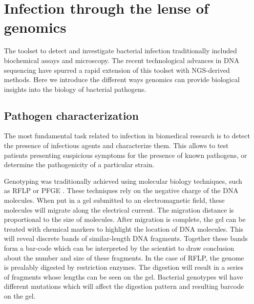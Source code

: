 
\chapter{Infection through the lense of genomics} %

\label{ch:01-02} %


The toolset to detect and investigate bacterial infection traditionally included biochemical assays and microscopy. The recent technological advances in DNA sequencing have spurred a rapid extension of this toolset with NGS-derived methods. Here we introduce the different ways genomics can provide biological insights into the biology of bacterial pathogens.

\section{Pathogen characterization}

The most fundamental task related to infection in biomedical research is to detect the presence of infectious agents and characterize them. This allows to test patients presenting suspicious symptoms for the presence of known pathogens, or determine the pathogenicity of a particular strain. 

Genotyping was traditionally achieved using molecular biology techniques, such as \acrfull{RFLP} or \acrfull{PFGE} \cite{ochoa-diazBacterialGenotypingMethods2018}. These techniques rely on the negative charge of the DNA molecules. When put in a gel submitted to an electromagnetic field, these molecules will migrate along the electrical current. The migration distance is proportional to the size of molecules. After migration is complete, the gel can be treated with chemical markers to highlight the location of DNA molecules. This will reveal discrete bands of similar-length DNA fragments. Together these bands form a bar-code which can be interpreted by the scientist to draw conclusion about the number and size of these fragments. In the case of \acrshort{RFLP}, the genome is prealably digested by \Gls{restriction enzyme}s. The digestion will result in a series of fragments whose lengths can be seen on the gel. Bacterial genotypes wil have different mutations which will affect the digestion pattern and resulting barcode on the gel.

